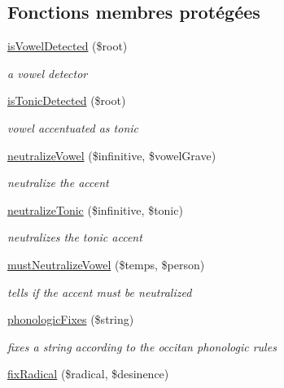 \subsection*{Fonctions membres protégées}
\begin{DoxyCompactItemize}
\item 
\hyperlink{class_conjugation_base_af8a92808eec27a866fe83fe64ba10784}{is\+Vowel\+Detected} (\$root)
\begin{DoxyCompactList}\small\item\em a vowel detector \end{DoxyCompactList}\item 
\hyperlink{class_conjugation_base_a5fd0cc4d15523febc5eabfc41d8bdb21}{is\+Tonic\+Detected} (\$root)
\begin{DoxyCompactList}\small\item\em vowel accentuated as tonic \end{DoxyCompactList}\item 
\hyperlink{class_conjugation_base_a7d66d915461d677c63117166cb85e813}{neutralize\+Vowel} (\$infinitive, \$vowel\+Grave)
\begin{DoxyCompactList}\small\item\em neutralize the accent \end{DoxyCompactList}\item 
\hyperlink{class_conjugation_base_a4fa62e858acfcf5eb83c11645687690c}{neutralize\+Tonic} (\$infinitive, \$tonic)
\begin{DoxyCompactList}\small\item\em neutralizes the tonic accent \end{DoxyCompactList}\item 
\hyperlink{class_conjugation_base_aeaff0cedbe91b8a5cd534401d3b3ed74}{must\+Neutralize\+Vowel} (\$temps, \$person)
\begin{DoxyCompactList}\small\item\em tells if the accent must be neutralized \end{DoxyCompactList}\item 
\hyperlink{class_conjugation_base_a4e623e786e39aecdaf26913685f9f040}{phonologic\+Fixes} (\$string)
\begin{DoxyCompactList}\small\item\em fixes a string according to the occitan phonologic rules \end{DoxyCompactList}\item 
\hyperlink{class_conjugation_base_ab55301132f0c90c3b5bf7f6cb44fc6b4}{fix\+Radical} (\$radical, \$desinence)

\end{DoxyCompactItemize}
